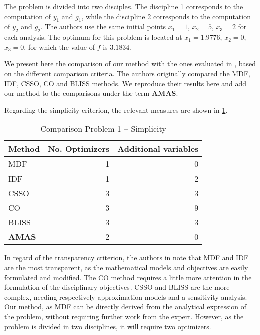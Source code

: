 The problem is divided into two disciples. The discipline 1 corresponds to the computation of $y_1$ and $g_1$, while the discipline 2 corresponds to the computation of  $y_2$ and $g_2$. The authors use the same initial points $x_1 = 1$, $x_2 = 5$, $x_3 = 2$ for each analysis. The optimum for this problem is located at $x_1 = 1.9776$, $x_2 = 0$, $x_3 = 0$, for which the value of $f$ is $3.1834$.

We present here the comparison of our method with the ones evaluated in \cite{perez2004evaluation}, based on the different comparison criteria. The authors originally compared the MDF, IDF, CSSO, CO and BLISS methods. We reproduce their results here and add our method to the comparisons under the term \textbf{AMAS}.

Regarding the simplicity criterion, the relevant measures are shown in \tablename{} \ref{bench1_simplicity}.

\begin{table}
\caption{Comparison Problem 1 -- Simplicity}\label{bench1_simplicity}
\centering
\begin{tabular}{lrr}
\toprule
Method & No. Optimizers & Additional variables\\
\midrule
MDF					&	1	&	0	\\
IDF						&	1	&	2	\\
CSSO					& 3	&	3	\\
CO						&	3	&	9	\\
BLISS					&	3	&	3	\\
\textbf{AMAS}	&	2	&	0	\\
\bottomrule
\end{tabular}
\end{table}

In regard of the transparency criterion, the authors in \cite{perez2004evaluation} note that MDF and IDF are the most transparent, as the mathematical models and objectives are easily formulated and modified. The CO method requires a little more attention in the formulation of the disciplinary objectives. CSSO and BLISS are the more complex, needing respectively approximation models and a sensitivity analysis.\\
Our method, as MDF can be directly derived from the analytical expression of the problem, without requiring further work from the expert. However, as the problem is divided in two disciplines, it will require two optimizers.

